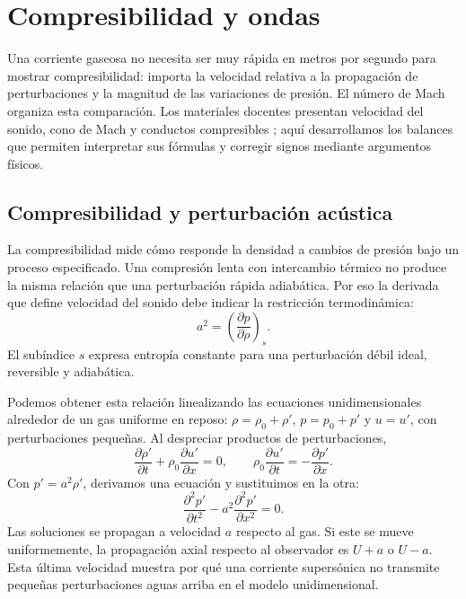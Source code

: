 \chapter{Compresibilidad y ondas}\label{ch:08}

Una corriente gaseosa no necesita ser muy rápida en metros por segundo para mostrar compresibilidad: importa la velocidad relativa a la propagación de perturbaciones y la magnitud de las variaciones de presión. El número de Mach organiza esta comparación. Los materiales docentes presentan velocidad del sonido, cono de Mach y conductos compresibles \cite{TAE3}; aquí desarrollamos los balances que permiten interpretar sus fórmulas y corregir signos mediante argumentos físicos.

\section{Compresibilidad y perturbación acústica}
La compresibilidad mide cómo responde la densidad a cambios de presión bajo un proceso especificado. Una compresión lenta con intercambio térmico no produce la misma relación que una perturbación rápida adiabática. Por eso la derivada que define velocidad del sonido debe indicar la restricción termodinámica:
\begin{equation}\label{eq:08-sonido}
 a^2=\left(\frac{\partial p}{\partial\rho}\right)_s.
\end{equation}
El subíndice $s$ expresa entropía constante para una perturbación débil ideal, reversible y adiabática.

Podemos obtener esta relación linealizando las ecuaciones unidimensionales alrededor de un gas uniforme en reposo: $\rho=\rho_0+\rho'$, $p=p_0+p'$ y $u=u'$, con perturbaciones pequeñas. Al despreciar productos de perturbaciones,
\begin{equation}
 \frac{\partial\rho'}{\partial t}+\rho_0\frac{\partial u'}{\partial x}=0,
 \qquad \rho_0\frac{\partial u'}{\partial t}=-\frac{\partial p'}{\partial x}.
\end{equation}
Con $p'=a^2\rho'$, derivamos una ecuación y sustituimos en la otra:
\begin{equation}
 \frac{\partial^2p'}{\partial t^2}-a^2\frac{\partial^2p'}{\partial x^2}=0.
\end{equation}
Las soluciones se propagan a velocidad $a$ respecto al gas. Si este se mueve uniformemente, la propagación axial respecto al observador es $U+a$ o $U-a$. Esta última velocidad muestra por qué una corriente supersónica no transmite pequeñas perturbaciones aguas arriba en el modelo unidimensional.

